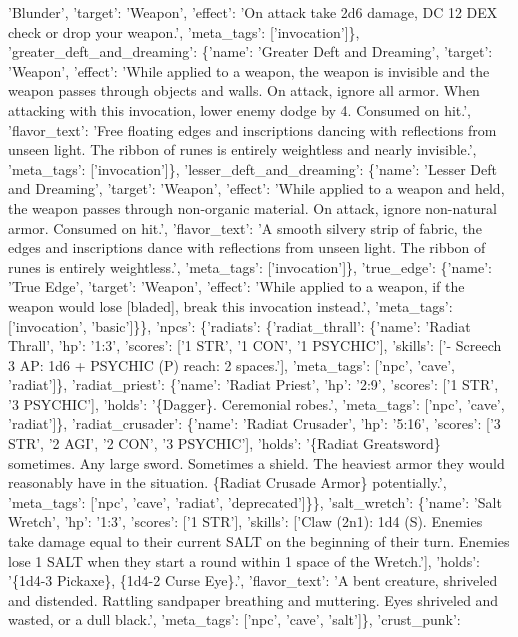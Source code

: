 \documentclass[
  letterpaper,
  DIV=11,
  numbers=noendperiod]{scrartcl}
\begin{document}
{'Blunder', 'target': 'Weapon', 'effect': 'On attack take 2d6 damage, DC
12 DEX check or drop your weapon.', 'meta\_tags': {[}'invocation'{]}\},
'greater\_deft\_and\_dreaming': \{'name': 'Greater Deft and Dreaming',
'target': 'Weapon', 'effect': 'While applied to a weapon, the weapon is
invisible and the weapon passes through objects and walls. On attack,
ignore all armor. When attacking with this invocation, lower enemy dodge
by 4. Consumed on hit.', 'flavor\_text': 'Free floating edges and
inscriptions dancing with reflections from unseen light. The ribbon of
runes is entirely weightless and nearly invisible.', 'meta\_tags':
{[}'invocation'{]}\}, 'lesser\_deft\_and\_dreaming': \{'name': 'Lesser
Deft and Dreaming', 'target': 'Weapon', 'effect': 'While applied to a
weapon and held, the weapon passes through non-organic material. On
attack, ignore non-natural armor. Consumed on hit.', 'flavor\_text': 'A
smooth silvery strip of fabric, the edges and inscriptions dance with
reflections from unseen light. The ribbon of runes is entirely
weightless.', 'meta\_tags': {[}'invocation'{]}\}, 'true\_edge':
\{'name': 'True Edge', 'target': 'Weapon', 'effect': 'While applied to a
weapon, if the weapon would lose {[}bladed{]}, break this invocation
instead.', 'meta\_tags': {[}'invocation', 'basic'{]}\}\}, 'npcs':
\{'radiats': \{'radiat\_thrall': \{'name': 'Radiat Thrall', 'hp': '1:3',
'scores': {[}'1 STR', '1 CON', '1 PSYCHIC'{]}, 'skills': {[}'- Screech 3
AP: 1d6 + PSYCHIC (P) reach: 2 spaces.'{]}, 'meta\_tags': {[}'npc',
'cave', 'radiat'{]}\}, 'radiat\_priest': \{'name': 'Radiat Priest',
'hp': '2:9', 'scores': {[}'1 STR', '3 PSYCHIC'{]}, 'holds': '\{Dagger\}.
Ceremonial robes.', 'meta\_tags': {[}'npc', 'cave', 'radiat'{]}\},
'radiat\_crusader': \{'name': 'Radiat Crusader', 'hp': '5:16', 'scores':
{[}'3 STR', '2 AGI', '2 CON', '3 PSYCHIC'{]}, 'holds': '\{Radiat
Greatsword\} sometimes. Any large sword. Sometimes a shield. The
heaviest armor they would reasonably have in the situation. \{Radiat
Crusade Armor\} potentially.', 'meta\_tags': {[}'npc', 'cave', 'radiat',
'deprecated'{]}\}\}, 'salt\_wretch': \{'name': 'Salt Wretch', 'hp':
'1:3', 'scores': {[}'1 STR'{]}, 'skills': {[}'Claw (2n1): 1d4 (S).
Enemies take damage equal to their current SALT on the beginning of
their turn. Enemies lose 1 SALT when they start a round within 1 space
of the Wretch.'{]}, 'holds': '\{1d4-3 Pickaxe\}, \{1d4-2 Curse Eye\}.',
'flavor\_text': 'A bent creature, shriveled and distended. Rattling
sandpaper breathing and muttering. Eyes shriveled and wasted, or a dull
black.', 'meta\_tags': {[}'npc', 'cave', 'salt'{]}\}, 'crust\_punk':
}
\end{document}
